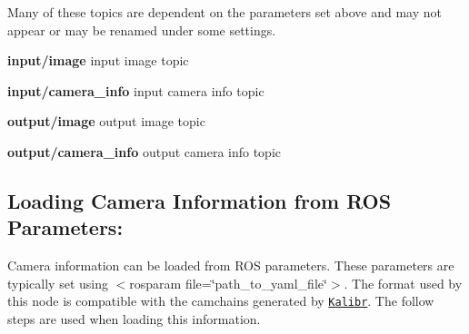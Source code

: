 Many of these topics are dependent on the parameters set above and may not appear or may be renamed under some settings.
\begin{DoxyItemize}
\item {\bfseries input/image} input image topic
\item {\bfseries input/camera\+\_\+info} input camera info topic
\item {\bfseries output/image} output image topic
\item {\bfseries output/camera\+\_\+info} output camera info topic
\end{DoxyItemize}\hypertarget{md_vision_layer_image_undistort_README_autotoc_md99}{}\subsection{Loading Camera Information from R\+O\+S Parameters\+:}\label{md_vision_layer_image_undistort_README_autotoc_md99}
Camera information can be loaded from R\+OS parameters. These parameters are typically set using $<$rosparam file=\char`\"{}path\+\_\+to\+\_\+yaml\+\_\+file\char`\"{}$>$. The format used by this node is compatible with the camchains generated by \href{https://github.com/ethz-asl/kalibr}{\tt Kalibr}. The follow steps are used when loading this information.


